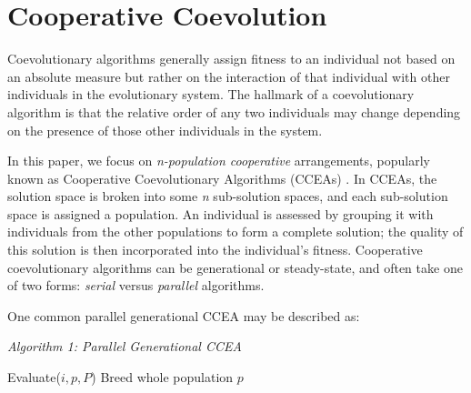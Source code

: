 \documentclass{sig-alt-full}
\begin{document}
\section{Cooperative Coevolution}

Coevolutionary algorithms generally assign fitness to an individual not based on an absolute measure but rather on the interaction of that individual with other individuals in the evolutionary system.  The hallmark of a coevolutionary algorithm is that the relative order of any two individuals may change depending on the presence of those other individuals in the system.


In this paper, we focus on {\it n-population cooperative} arrangements, popularly known as Cooperative Coevolutionary Algorithms (CCEAs) \cite{Potter94,Potter00}.  In CCEAs, the solution space is broken into some {\it n} sub-solution spaces, and each sub-solution space is assigned a population.  An individual is assessed by grouping it with individuals from the other populations to form a complete solution; the quality of this solution is then incorporated into the individual's fitness.  Cooperative coevolutionary algorithms can be generational or steady-state, and often take one of two forms: {\it serial} versus {\it parallel} algorithms. One common parallel generational CCEA may be described as:

\vspace{1in}

{\it{\sc Algorithm 1:} Parallel Generational CCEA}
\begin{algorithmic}[0]
\Loop\hspace{\fill}
			\State Evaluate(\(i, p, P\))
		\EndFor
	\EndFor
		\vspace{-0.25em}
		\State Breed whole population \(p\)
	\EndFor
\EndLoop
\end{algorithmic}
\end{document}
